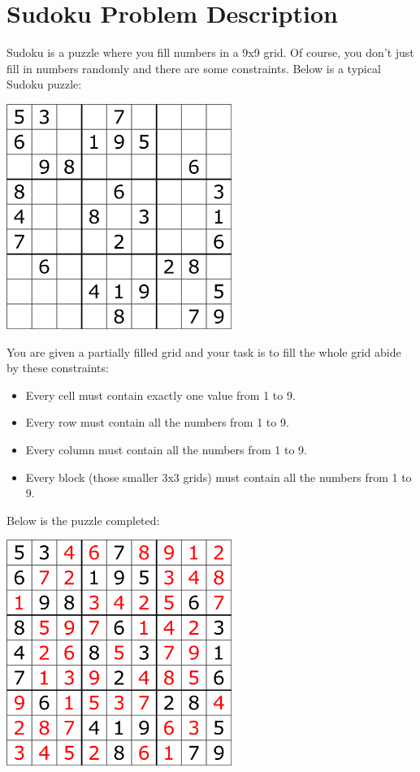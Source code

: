 \documentclass[a4paper]{tufte-book}
\begin{document}
\section{Sudoku Problem Description}
Sudoku is a puzzle where you fill numbers in a 9x9 grid. Of course, you don't just fill in numbers randomly and there are some constraints. Below is a typical Sudoku puzzle:
\begin{center}
\includegraphics[width=0.55\textwidth]{sudoku}
\end{center}
You are given a partially filled grid and your task is to fill the whole grid abide by these constraints:
\begin{itemize}
\item Every cell must contain exactly one value from 1 to 9.
\item Every row must contain all the numbers from 1 to 9.
\item Every column must contain all the numbers from 1 to 9.
\item Every block (those smaller 3x3 grids) must contain all the numbers from 1 to 9.
\end{itemize}

Below is the puzzle completed:
\begin{center}
\includegraphics[width=0.55\textwidth]{csudoku}
\end{center}
\end{document}
